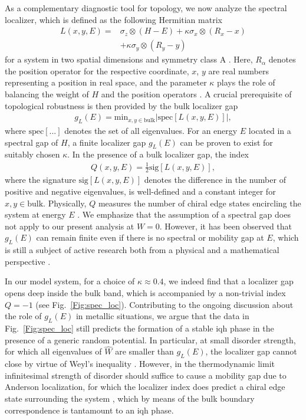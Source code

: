 \documentclass[aps,prl,amsmath,amssymb,twocolumn, superscriptaddress]{revtex4-2}
\begin{document}
As a complementary diagnostic tool for topology, we now analyze the spectral localizer, which is defined as the following Hermitian matrix
\begin{align}
L(x,y,E) =&  \sigma_z \otimes (H - E) + \kappa \sigma_x \otimes (R_x - x) \nonumber \\
&+ \kappa \sigma_y \otimes (R_y - y)
\end{align}
for a system in two spatial dimensions and symmetry class A \cite{Budich2013, Symmetry_classes}. Here, $R_\alpha$ denotes the position operator for the respective coordinate, $x$, $y$ are real numbers representing a position in real space, and the parameter $\kappa$ plays the role of balancing the weight of $H$ and the position operators \cite{Spec_loc_1, Spec_loc_2, Spec_loc_3, Spec_loc_4, Spec_loc_5}. A crucial prerequisite of topological robustness is then provided by the bulk localizer gap
\begin{align}
g_{L}(E) = \text{min}_{x,y \in \text{bulk}} \left| \text{spec}[L(x,y, E)]\right|, \label{Eqn:loc_gap}
\end{align}
where $\text{spec}[...]$ denotes the set of all eigenvalues. For an energy $E$ located in a spectral gap of $H$, a finite localizer gap $g_{L}(E)$ can be proven to exist for suitably chosen $\kappa$. In the presence of a bulk localizer gap, the index 
\begin{align}
Q(x,y, E) = \frac{1}{2} \text{sig}[L(x,y, E)], \label{Eqn:loc_index}
\end{align}
where the signature $\text{sig}[L(x,y, E)]$ denotes the difference in the number of positive and negative eigenvalues, is well-defined and a constant integer for $x,y \in \text{bulk}$. Physically, $Q$ measures the number of chiral edge states encircling the system at energy $E$ \cite{Spec_loc_1, Spec_loc_2, Spec_loc_3, Spec_loc_4, Spec_loc_5}.
We emphasize that the assumption of a spectral gap does not apply to our present analysis at $W=0$. However, it has been observed that $g_{L}(E)$ can remain finite even if there is no spectral or mobility gap at $E$, which is still a subject of active research both from a physical and a mathematical perspective \cite{Fine_structure, Spec_loc_4}.

In our model system, for a choice of $\kappa \approx 0.4$, we indeed find that a localizer gap opens deep inside the bulk band, which is accompanied by a non-trivial index $Q = -1$ (see Fig.~\ref{Fig:spec_loc}). Contributing to the ongoing discussion about the role of $g_{L}(E)$ in metallic situations, we argue that the data in Fig.~\ref{Fig:spec_loc} still predicts the formation of a stable \gls{iqh} phase in the presence of a generic random potential. In particular, at small disorder strength, for which all eigenvalues of $\hat W$ are smaller than $g_{L}(E)$, the localizer gap cannot close by virtue of Weyl's inequality \cite{Fine_structure, Spec_loc_5,Supplemental}. However, in the thermodynamic limit infinitesimal strength of disorder should suffice to cause a mobility gap due to Anderson localization, for which the localizer index does predict a chiral edge state surrounding the system \cite{spec_loc_mobility_gap}, which by means of the bulk boundary correspondence is tantamount to an \gls{iqh} phase.
\end{document}
